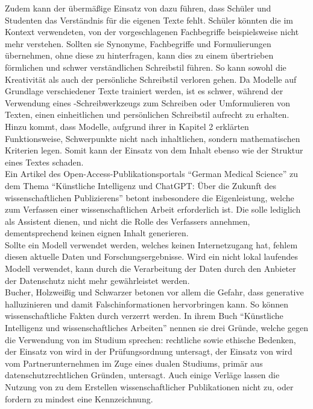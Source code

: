 \documentclass[../main.tex]{subfiles}
\begin{document}
Zudem kann der übermäßige Einsatz von  dazu führen, dass Schüler und Studenten das Verständnis für die eigenen Texte fehlt. Schüler könnten die im 
Kontext verwendeten, von der  vorgeschlagenen Fachbegriffe beispielsweise nicht mehr verstehen. Sollten sie Synonyme, Fachbegriffe und Formulierungen 
übernehmen, ohne diese zu hinterfragen, kann dies zu einem übertrieben förmlichen und schwer verständlichen Schreibstil führen\cite{teachers}. 
So kann sowohl die Kreativität als auch der persönliche Schreibstil verloren gehen. Da  Modelle auf Grundlage verschiedener Texte trainiert werden, ist es
schwer, während der Verwendung eines -Schreibwerkzeugs zum Schreiben oder Umformulieren von Texten, einen einheitlichen und persönlichen Schreibstil aufrecht zu erhalten\cite{creativeWriting}. Hinzu kommt,
dass  Modelle, aufgrund ihrer in Kapitel 2 erklärten Funktionsweise, Schwerpunkte nicht nach inhaltlichen, sondern mathematischen Kriterien legen\cite{berensBolk}. Somit kann der 
Einsatz von  dem Inhalt ebenso wie der Struktur eines Textes schaden.\\

Ein Artikel des Open-Access-Publikationsportals "`German Medical Science"' zu dem Thema "`Künstliche Intelligenz und ChatGPT: Über die Zukunft des wissenschaftlichen Publizierens"'
betont insbesondere die Eigenleistung, welche zum Verfassen einer wissenschaftlichen Arbeit erforderlich ist. Die  solle lediglich als Assistent dienen, und
nicht die Rolle des Verfassers annehmen, dementsprechend keinen eignen Inhalt generieren. \\ Sollte ein  Modell verwendet werden, welches keinen Internetzugang hat,
fehlem diesen aktuelle Daten und Forschungsergebnisse. Wird ein nicht lokal laufendes Modell verwendet, kann durch die Verarbeitung der Daten durch den  Anbieter
der Datenschutz nicht mehr gewährleistet werden.\cite{ZukunftWissenschaftlichesPublizieren} \\ Bucher, Holzweißig und Schwarzer betonen vor allem die Gefahr, dass 
generative  halluzinieren und damit Falschinformationen hervorbringen kann. So können wissenschaftliche Fakten durch  verzerrt werden. In ihrem Buch "`Künstliche Intelligenz und wissenschaftliches Arbeiten"' nennen sie drei 
Gründe, welche gegen die Verwendung von  im Studium sprechen: rechtliche sowie ethische Bedenken, der Einsatz von  wird in der Prüfungsordnung untersagt, 
der Einsatz von  wird vom Partnerunternehmen im Zuge eines dualen Studiums, primär aus datenschutzrechtlichen Gründen, untersagt.\cite{BucherSchwarzerHolzwweißig} Auch einige Verläge lassen 
die Nutzung von  zu dem Erstellen wissenschaftlicher Publikationen nicht zu, oder fordern zu mindest eine Kennzeichnung\cite{ZukunftWissenschaftlichesPublizieren}. 
\end{document}
